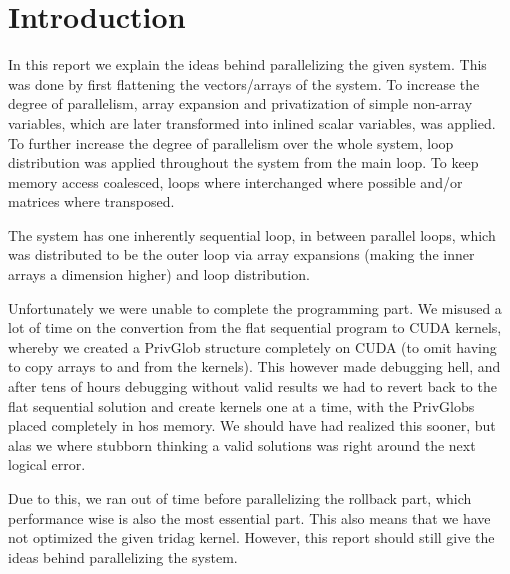 \section{Introduction}
In this report we explain the ideas behind parallelizing the given system. This was done by first flattening the vectors/arrays of the system. To increase the degree of parallelism, array expansion and privatization of simple non-array variables, which are later transformed into inlined scalar variables, was applied. To further increase the degree of parallelism over the whole system, loop distribution was applied throughout the system from the main loop. To keep memory access coalesced, loops where interchanged where possible and/or matrices where transposed. 

The system has one inherently sequential loop, in between parallel loops, which was distributed to be the outer loop via array expansions (making the inner arrays a dimension higher) and loop distribution.

Unfortunately we were unable to complete the programming part. We misused a lot of time on the convertion from the flat sequential program to CUDA kernels, whereby we created a PrivGlob structure completely on CUDA (to omit having to copy arrays to and from the kernels). This however made debugging hell, and after tens of hours debugging without valid results we had to revert back to the flat sequential solution and create kernels one at a time, with the PrivGlobs placed completely in hos memory. We should have had realized this sooner, but alas we where stubborn thinking a valid solutions was right around the next logical error.

Due to this, we ran out of time before parallelizing the rollback part, which performance wise is also the most essential part. This also means that we have not optimized the given tridag kernel. However, this report should still give the ideas behind parallelizing the system.
